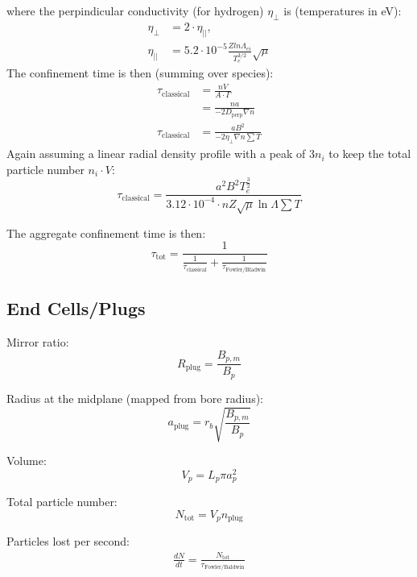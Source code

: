 where the perpindicular conductivity (for hydrogen) $\eta_\perp$ is (temperatures in eV):
\begin{align}
    \eta_{\perp} &= 2 \cdot \eta_{||}, \\
    \eta_{||} &= 5.2 \cdot 10^{-5} \frac{Z ln \Lambda_{ei}}{T_e^{3/2}} \sqrt{\mu}
\end{align}
The confinement time is then (summing over species):
\begin{align}
    \tau_\text{classical} &= \frac{n V}{A \cdot \Gamma} \\
    &= \frac{n a}{-2 D_\text{perp} \nabla n} \\
    \tau_\text{classical} &= \frac{a B^2}{-2 \eta_\perp \nabla n \sum T}
\end{align}
Again assuming a linear radial density profile with a peak of $3n_i$ to keep the total particle number $n_i \cdot V$:
\begin{equation}
    \tau_\text{classical} = \frac{a^2 B^2 T_e^{\frac{3}{2}}}{3.12 \cdot 10^{-4} \cdot n Z \sqrt{\mu} \ln{\Lambda} \sum{T}}
\end{equation}

The aggregate confinement time is then:
\begin{equation}
    \tau_\text{tot} = \frac{1}{\frac{1}{\tau_\text{classical}} + \frac{1}{\tau_\text{Fowler/Bladwin}}} 
\end{equation}

\subsection{End Cells/Plugs}

Mirror ratio:
\begin{equation}
    R_{\text{plug}} = \frac{B_{p,m}}{B_p}
\end{equation}

Radius at the midplane (mapped from bore radius):
\begin{equation}
    a_{\text{plug}} = r_b \sqrt{\frac{B_{p,m}}{B_p}}
\end{equation}

Volume:
\begin{equation}
    V_p = L_p \pi a_p^2
\end{equation}

Total particle number:
\begin{equation}
    N_{\text{tot}} = V_p n_{\text{plug}}
\end{equation}

Particles lost per second:
\begin{align}
    \frac{dN}{dt} = \frac{N_{\text{tot}}}{\tau_{\text{Fowler/Baldwin}}}
\end{align}

